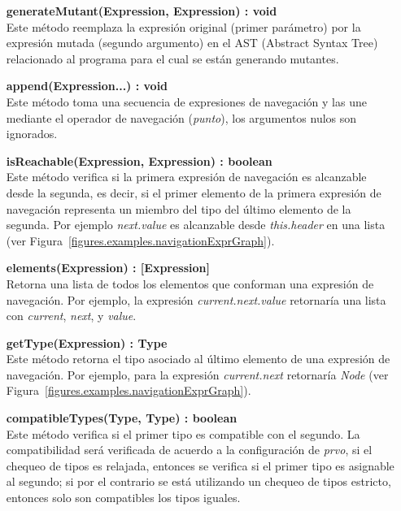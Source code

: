 \begin{enumerate}[leftmargin=.75cm,align=left]
	\item[\textbf{generateMutant(Expression, Expression) : void}]\mbox{}\\ Este m\'etodo reemplaza la expresi\'on original (primer par\'ametro) por la expresi\'on mutada (segundo argumento) en el AST (Abstract Syntax Tree) relacionado al programa para el cual se est\'an generando mutantes.
	
	\item[\textbf{append(Expression...) : void}]\mbox{}\\ Este m\'etodo toma una secuencia de expresiones de navegaci\'on y las une mediante el operador de navegaci\'on (\emph{punto}), los argumentos nulos son ignorados.
	
	\item[\textbf{isReachable(Expression, Expression) : boolean}]\mbox{}\\ Este m\'etodo verifica si la primera expresi\'on de navegaci\'on es alcanzable desde la segunda, es decir, si el primer elemento de la primera expresi\'on de navegaci\'on representa un miembro del tipo del \'ultimo elemento de la segunda. Por ejemplo \emph{next.value} es alcanzable desde \emph{this.header} en una lista (ver Figura~\ref{figures.examples.navigationExprGraph}).
	
	\item[\textbf{elements(Expression) : [Expression]}]\mbox{}\\ Retorna una lista de todos los elementos que conforman una expresi\'on de navegaci\'on. Por ejemplo, la expresi\'on \emph{current.next.value} retornar\'ia una lista con \emph{current}, \emph{next}, y \emph{value}.
	
	\item[\textbf{getType(Expression) : Type}]\mbox{}\\ Este m\'etodo retorna el tipo asociado al \'ultimo elemento de una expresi\'on de navegaci\'on. Por ejemplo, para la expresi\'on \emph{current.next} retornar\'ia \emph{Node} (ver Figura~\ref{figures.examples.navigationExprGraph}).
	
	\item[\textbf{compatibleTypes(Type, Type) : boolean}]\mbox{}\\ Este m\'etodo verifica si el primer tipo es compatible con el segundo. La compatibilidad ser\'a verificada de acuerdo a la configuraci\'on de \emph{prvo}, si el chequeo de tipos es relajada, entonces se verifica si el primer tipo es asignable al segundo; si por el contrario se est\'a utilizando un chequeo de tipos estricto, entonces solo son compatibles los tipos iguales.
	

\end{enumerate}
